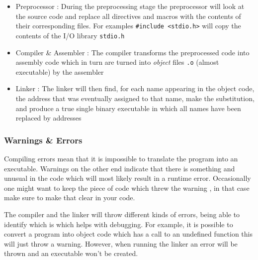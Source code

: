 \begin{itemize}\item{Preprocessor : During the preprocessing stage the preprocessor will look at the source code and replace all directives and macros with the contents of their corresponding files. For examples \texttt{\#include <stdio.h>} will copy the contents of the I/O library \texttt{stdio.h}}


	
	\item{Compiler \& Assembler : The compiler transforms the preprocessed code into assembly code which in turn are turned into \textit{object} files \texttt{.o} (almost executable) by the assembler}

	\item{Linker : The linker will then find, for each name appearing in the object code, the address that was eventually assigned to that name, make the substitution, and produce a true single binary executable in which all names have been replaced by addresses}
\end{itemize}



\subsubsection{Warnings \& Errors}

\par{Compiling errors mean that it is impossible to translate the program into an executable.
Warnings on the other end indicate that there is something and unusual in the code which will most
likely result in a runtime error. Occasionally one might want to keep the piece of code which threw the warning , in that case make sure to make that
clear in your code.} 

\par{The compiler and the linker will throw different kinds of errors, being able to identify which is which helps with debugging. For example, it is possible to convert a program into object code which has a call to an undefined function this will just throw a warning. However, when running the linker an error will be thrown and an executable won't be created.}








